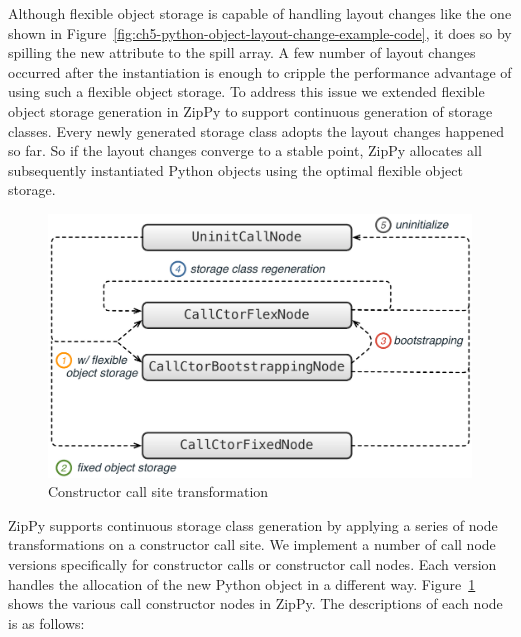 Although flexible object storage is capable of handling layout changes like the one shown in Figure~\ref{fig:ch5-python-object-layout-change-example-code}, it does so by spilling the new attribute to the spill array.
A few number of layout changes occurred after the instantiation is enough to cripple the performance advantage of using such a flexible object storage.
To address this issue we extended flexible object storage generation in ZipPy to support continuous generation of storage classes.
Every newly generated storage class adopts the layout changes happened so far.
So if the layout changes converge to a stable point, ZipPy allocates all subsequently instantiated Python objects using the optimal flexible object storage.

\begin{figure}
\centering
\includegraphics[scale=.65]{figures/ch5-constructor-call-site-transformation}
\caption{Constructor call site transformation}
\label{fig:ch5-constructor-call-site-transformation}
\end{figure}

ZipPy supports continuous storage class generation by applying a series of node transformations on a constructor call site.
We implement a number of call node versions specifically for constructor calls or constructor call nodes.
Each version handles the allocation of the new Python object in a different way.
Figure~\ref{fig:ch5-constructor-call-site-transformation} shows the various call constructor nodes in ZipPy.
The descriptions of each node is as follows:

